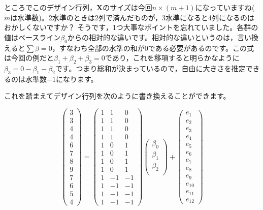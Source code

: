 \documentclass{ltjsbook}
\begin{document}
ところでこのデザイン行列，$\bm{X}$のサイズは今回$n \times (m+1)$になっていますね($m$は水準数)。2水準のときは2列で済んだものが，3水準になると4列になるのはおかしくないですか？
そうです，1つ大事なポイントを忘れていました。各群の値はベースライン$\beta_0$からの相対的な違いです。相対的な違いというのは，言い換えると$\sum \beta =0$，すなわち全部の水準の和が$0$である必要があるのです。この式は今回の例だと$\beta_1+\beta_2+\beta_3=0$であり，これを移項すると明らかなように$\beta_3 = 0 - \beta_1 - \beta_2$です。つまり総和が決まっているので，自由に大きさを推定できるのは水準数$-1$になります。

これを踏まえてデザイン行列を次のように書き換えることができます。

\[
	\begin{pmatrix}
		3 \\
		3 \\
		4 \\
		4 \\
		6 \\
		7 \\
		8 \\
		9 \\
		7 \\
		6 \\
		5 \\
		4
	\end{pmatrix}
	=
	\begin{pmatrix}
		1 & 1  & 0  \\
		1 & 1  & 0  \\
		1 & 1  & 0  \\
		1 & 1  & 0  \\
		1 & 0  & 1  \\
		1 & 0  & 1  \\
		1 & 0  & 1  \\
		1 & 0  & 1  \\
		1 & -1 & -1 \\
		1 & -1 & -1 \\
		1 & -1 & -1 \\
		1 & -1 & -1
	\end{pmatrix}
	\begin{pmatrix}
		\beta_0 \\
		\beta_1 \\
		\beta_2 \\
	\end{pmatrix}+
	\begin{pmatrix}
		e_1    \\
		e_2    \\
		e_3    \\
		e_4    \\
		e_5    \\
		e_6    \\
		e_7    \\
		e_8    \\
		e_9    \\
		e_{10} \\
		e_{11} \\
		e_{12}
	\end{pmatrix}
\]
\end{document}
